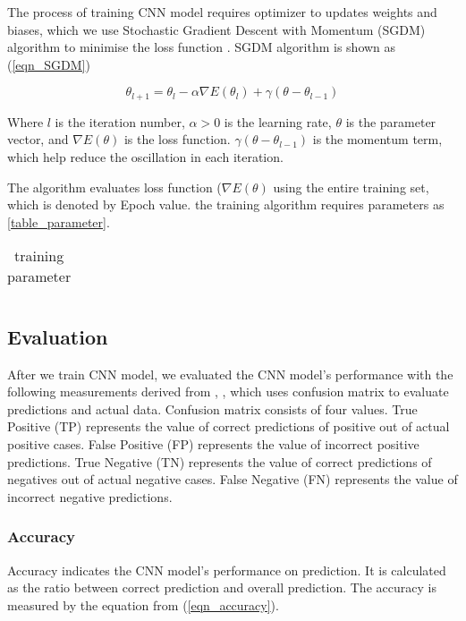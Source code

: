 \documentclass[conference]{IEEEtran}
\begin{document}
The process of training CNN model requires optimizer to updates weights and biases, which we use Stochastic Gradient Descent with Momentum (SGDM) algorithm to minimise the loss function \cite{b7}. SGDM algorithm is shown as (\ref{eqn_SGDM})

\begin{equation}
\theta_{l+1} = \theta_l - \alpha\nabla E(\theta_l) + \gamma(\theta - \theta_{l-1}) 
\label{eqn_SGDM}
\end{equation}

Where $l$ is the iteration number, $\alpha > 0$ is the learning rate, $\theta $ is the parameter vector, and $\nabla E(\theta)$ is the loss function. $\gamma(\theta - \theta_{l-1})$ is the momentum term, which help reduce the oscillation in each iteration.

The algorithm evaluates loss function ($\nabla E(\theta)$ using the entire training set, which is denoted by Epoch value. the training algorithm requires parameters as \ref{table_parameter}.


\begin{table}[!htbp]
\centering
\caption{training parameter}
\begin{tabularx}{0.48\textwidth}{p{0.25\linewidth} | p{0.6\linewidth}}
\hline

\end{tabularx}%
\label{table_}
\end{table}


\subsection{Evaluation}

After we train CNN model, we evaluated the CNN model's performance with the following measurements derived from \cite{b5}, \cite{b6}, which uses confusion matrix to evaluate predictions and actual data. Confusion matrix consists of four values. True Positive (TP) represents the value of correct predictions of positive out of actual positive cases. False Positive (FP) represents the value of incorrect positive predictions. True Negative (TN) represents the value of correct predictions of negatives out of actual negative cases. False Negative (FN) represents the value of incorrect negative predictions.

\subsubsection{Accuracy}
Accuracy indicates the CNN model's performance on prediction. It is calculated as the ratio between correct prediction and overall prediction. The accuracy is measured by the equation from (\ref{eqn_accuracy}). 
\end{document}
